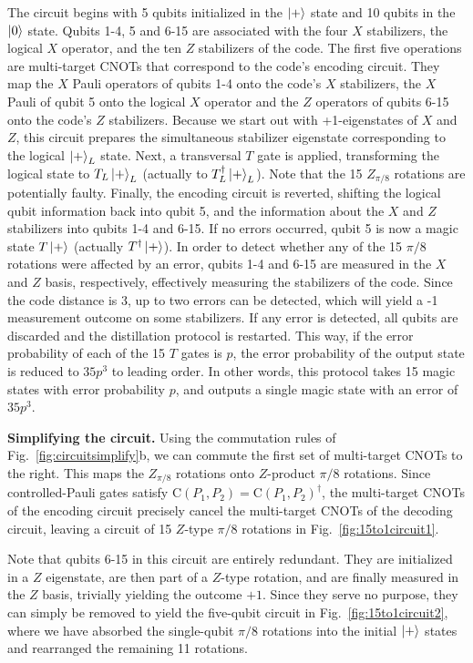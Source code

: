 \documentclass[prx,aps,letterpaper,twocolumn,allowfontchageintitle=true,accepted=2019-02-01]{quantumarticle}
\begin{document}
The circuit begins with 5 qubits initialized in the $\ket{+}$ state and 10 qubits in the $\ket{0}$ state. Qubits 1-4, 5 and 6-15 are associated with the four $X$ stabilizers, the logical $X$ operator, and the ten $Z$ stabilizers of the code. The first five operations are multi-target CNOTs that correspond to the code's encoding circuit. They map the $X$ Pauli operators of qubits 1-4 onto the code's $X$ stabilizers, the $X$ Pauli of qubit 5 onto the logical $X$ operator and the $Z$ operators of qubits 6-15 onto the code's $Z$ stabilizers. Because we start out with +1-eigenstates of $X$ and $Z$, this circuit prepares the simultaneous stabilizer eigenstate corresponding to the logical $\ket{+}_L$ state. Next, a transversal $T$ gate is applied, transforming the logical state to $T_L \ket{+}_L$ (actually to $T_L^\dagger \ket{+}_L$). Note that the 15 $Z_{\pi/8}$ rotations are potentially faulty. Finally, the encoding circuit is reverted, shifting the logical qubit information back into qubit 5, and the information about the $X$ and $Z$ stabilizers into qubits 1-4 and 6-15. If no errors occurred, qubit 5 is now a magic state $T\ket{+}$ (actually $T^\dagger\ket{+}$). In order to detect whether any of the 15 $\pi/8$ rotations were affected by an error, qubits 1-4 and 6-15 are measured in the $X$ and $Z$ basis, respectively, effectively measuring the stabilizers of the code. Since the code distance is 3, up to two errors can be detected, which will yield a -1 measurement outcome on some stabilizers. If any error is detected, all qubits are discarded and the distillation protocol is restarted. This way, if the error probability of each of the 15 $T$ gates is $p$, the error probability of the output state is reduced to $35p^3$ to leading order. In other words, this protocol takes 15 magic states with error probability $p$, and outputs a single magic state with an error of $35p^3$.

\textbf{Simplifying the circuit.} Using the commutation rules of Fig.~\ref{fig:circuitsimplify}b, we can commute the first set of multi-target CNOTs to the right. This maps the $Z_{\pi/8}$ rotations onto $Z$-product $\pi/8$ rotations. Since controlled-Pauli gates satisfy $\mathrm{C}(P_1,P_2) = \mathrm{C}(P_1,P_2)^\dagger$, the multi-target CNOTs of the encoding circuit precisely cancel the multi-target CNOTs of the decoding circuit, leaving a circuit of 15 $Z$-type $\pi/8$ rotations in Fig.~\ref{fig:15to1circuit1}.

Note that qubits 6-15 in this circuit are entirely redundant. They are initialized in a $Z$ eigenstate, are then part of a $Z$-type rotation, and are finally measured in the $Z$ basis, trivially yielding the outcome $+1$. Since they serve no purpose, they can simply be removed to yield the five-qubit circuit in Fig.~\ref{fig:15to1circuit2}, where we have absorbed the single-qubit $\pi/8$ rotations into the initial $\ket{+}$ states and rearranged the remaining 11 rotations.
\end{document}
